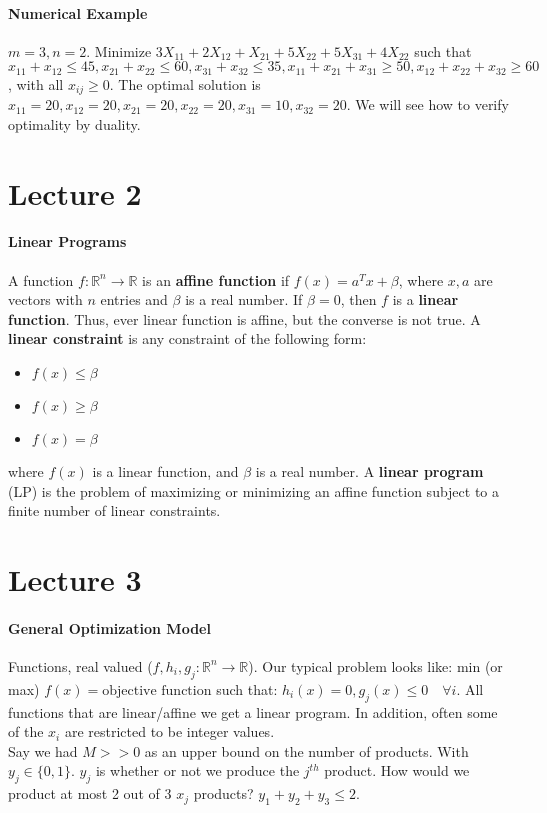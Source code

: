 \documentclass[10pt,letter]{article}
\theoremstyle{plain}
\theoremstyle{definition}
\begin{document}
\paragraph{Numerical Example}
$m=3, n=2$. Minimize $3X_{11}+2X_{12}+X_{21}+5X_{22}+5X_{31}+4X_{22}$ such that $x_{11}+x_{12}\leq 45,x_{21}+x_{22}\leq60,x_{31}+x_{32}\leq 35,x_{11}+x_{21}+x_{31}\geq50, x_{12}+x_{22}+x_{32}\geq60$, with all $x_{ij}\geq0$. The optimal solution is $x_{11}=20,x_{12}=20,x_{21}=20,x_{22}=20,x_{31}=10,x_{32}=20$. We will see how to verify optimality by duality.

\section*{Lecture 2}
\paragraph{Linear Programs}
A function $f:\mathbb{R}^n\rightarrow\mathbb{R}$ is an \textbf{affine function} if $f(x)=a^Tx+\beta$, where $x,a$ are vectors with $n$ entries and $\beta$ is a real number. If $\beta=0$, then $f$ is a \textbf{linear function}. Thus, ever linear function is affine, but the converse is not true. A \textbf{linear constraint} is any constraint of the following form: 
\begin{itemize}
    \item $f(x)\leq\beta$
    \item $f(x)\geq\beta$ 
    \item $f(x)=\beta$ 
\end{itemize}
where $f(x)$ is a linear function, and $\beta$ is a real number. A \textbf{linear program} (LP) is the problem of maximizing or minimizing an affine function subject to a finite number of linear constraints. 



\section*{Lecture 3}
\paragraph{General Optimization Model}
Functions, real valued ($f,h_i,g_j:\mathbb{R}^n\rightarrow\mathbb{R}$). Our typical problem looks like: min (or max) $f(x)=\text{objective function}$ such that: $h_i(x)=0,g_j(x)\leq0\quad\forall i$. All functions that are linear/affine we get a linear program. In addition, often some of the $x_i$ are restricted to be integer values. \\ 
Say we had $M>>0$ as an upper bound on the number of products. With $y_j\in\{0,1\}$. $y_j$ is whether or not we produce the $j^{th}$ product. How would we product at most 2 out of 3 $x_j$ products? $y_1+y_2+y_3\leq2$. 
\end{document}
